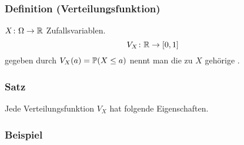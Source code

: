 \subsubsection{Definition (Verteilungsfunktion)}
$X\colon\Omega\to\mathbb{R}$ Zufallsvariablen.
\[V_X\colon\mathbb{R}\to[0,1]\]
gegeben durch $V_X(a)=\mathbb{P}(X\leq a)$ nennt man die zu $X$ geh\"orige .
\subsubsection{Satz}
Jede Verteilungsfunktion $V_X$ hat folgende Eigenschaften.
\subsubsection{Beispiel}
\weg
